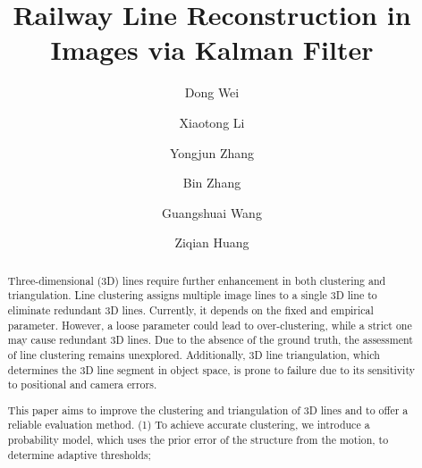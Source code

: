\documentclass[a4paper]{cas-sc}
\begin{document}
\linenumbers
\let\WriteBookmarks\relax
\def\floatpagepagefraction{1}

\shorttitle{}

\title [mode = title]{Railway Line Reconstruction in Images via Kalman Filter }                      


%
\author[1]{Dong Wei}
\fnmark[1]
\author[1]{Xiaotong Li}
\fnmark[1]
\author[1]{Yongjun Zhang}
\cormark[1]
\author[1]{Bin Zhang}
\fnmark[1]
\author[1]{Guangshuai Wang}
\fnmark[1]
\author[1]{Ziqian Huang}
\fnmark[1]







\begin{abstract}
Three-dimensional (3D) lines require further enhancement in both clustering and triangulation. 
Line clustering assigns multiple image lines to a single 3D line to eliminate redundant 3D lines.
Currently, it depends on the fixed and empirical parameter.
However,
a loose parameter could lead to over-clustering, 
while a strict one may cause redundant 3D lines. 
Due to the absence of the ground truth, 
the assessment of line clustering remains unexplored.
Additionally, 
3D line triangulation, 
which determines the 3D line segment in object space, 
is prone to failure due to its sensitivity to positional and camera errors.

\noindent This paper aims to improve the clustering and triangulation of 3D lines and to offer a reliable evaluation method. 
(1) To achieve accurate clustering, 
we introduce a probability model,
which uses the prior error of the structure from the motion,
to determine adaptive thresholds;
\end{abstract}
\end{document}
